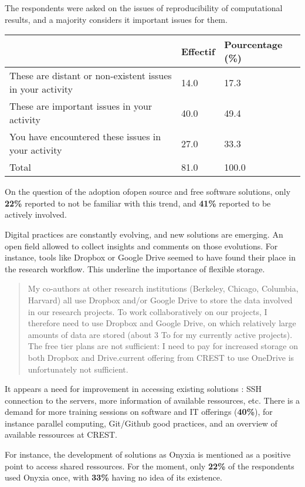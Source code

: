 \documentclass[
  letterpaper,
  DIV=11,
  numbers=noendperiod]{scrartcl}
\begin{document}
The respondents were asked on the issues of reproducibility of
computational results, and a majority considers it important issues for
them.

\begin{longtable}[]{@{}lll@{}}
\toprule\noalign{}
& Effectif & Pourcentage (\%) \\
\midrule\noalign{}
\endhead
\bottomrule\noalign{}
\endlastfoot
These are distant or non-existent issues in your activity & 14.0 &
17.3 \\
These are important issues in your activity & 40.0 & 49.4 \\
You have encountered these issues in your activity & 27.0 & 33.3 \\
Total & 81.0 & 100.0 \\
\end{longtable}

On the question of the adoption ofopen source and free software
solutions, only \textbf{22\%} reported to not be familiar with this
trend, and \textbf{41\%} reported to be actively involved.

Digital practices are constantly evolving, and new solutions are
emerging. An open field allowed to collect insights and comments on
those evolutions. For instance, tools like Dropbox or Google Drive
seemed to have found their place in the research workflow. This
underline the importance of flexible storage.

\begin{quote}
My co-authors at other research institutions (Berkeley, Chicago,
Columbia, Harvard) all use Dropbox and/or Google Drive to store the data
involved in our research projects. To work collaboratively on our
projects, I therefore need to use Dropbox and Google Drive, on which
relatively large amounts of data are stored (about 3 To for my currently
active projects). The free tier plans are not sufficient: I need to pay
for increased storage on both Dropbox and Drive.\nThe current offering
from CREST to use OneDrive is unfortunately not sufficient.
\end{quote}

It appears a need for improvement in accessing existing solutions : SSH
connection to the servers, more information of available ressources,
etc. There is a demand for more training sessions on software and IT
offerings (\textbf{40\%}), for instance parallel computing, Git/Github
good practices, and an overview of available ressources at CREST.

For instance, the development of solutions as Onyxia is mentioned as a
positive point to access shared ressources. For the moment, only
\textbf{22\%} of the respondents used Onyxia once, with \textbf{33\%}
having no idea of its existence.
\end{document}
